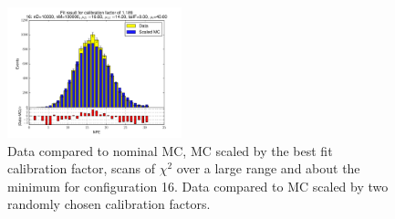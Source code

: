 \begin{figure}[htbp]
\begin{center}
\includegraphics[width=0.45\textwidth]{../FIGURES/16/FIG_Fit_result_for_calibration_factor_of_1_189.pdf} 
\caption{Data compared to nominal MC, MC scaled by the best fit calibration factor, scans of $\chi^2$ over a large range and about the minimum for configuration 16. Data compared to MC scaled by two randomly chosen calibration factors.} 
\label{tab:best_16} 
\end{center} \end{figure} 

